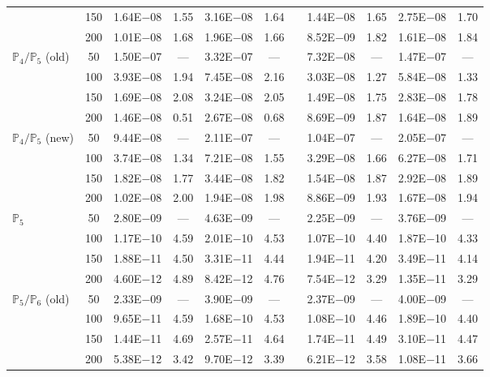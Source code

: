 \begin{table}[H]
{\begin{tabular}{@{}l c c c c c c c c c c@{}}
 & 150 & 1.64E$-$08 & 1.55  & 3.16E$-$08 & 1.64 &  & 1.44E$-$08 & 1.65 & 2.75E$-$08 & 1.70\\
 & 200 & 1.01E$-$08 & 1.68  & 1.96E$-$08 & 1.66 &  & 8.52E$-$09 & 1.82 & 1.61E$-$08 & 1.84\\
\midrule
\multirow{4}{*}{$\mathbb{P}_{4}/\mathbb{P}_{5}$ (old)}
 & 50 & 1.50E$-$07 & ---  & 3.32E$-$07 & --- &  & 7.32E$-$08 & --- & 1.47E$-$07 & ---\\
 & 100 & 3.93E$-$08 & 1.94  & 7.45E$-$08 & 2.16 &  & 3.03E$-$08 & 1.27 & 5.84E$-$08 & 1.33\\
 & 150 & 1.69E$-$08 & 2.08  & 3.24E$-$08 & 2.05 &  & 1.49E$-$08 & 1.75 & 2.83E$-$08 & 1.78\\
 & 200 & 1.46E$-$08 & 0.51  & 2.67E$-$08 & 0.68 &  & 8.69E$-$09 & 1.87 & 1.64E$-$08 & 1.89\\
\midrule
\multirow{4}{*}{$\mathbb{P}_{4}/\mathbb{P}_{5}$ (new)}
 & 50 & 9.44E$-$08 & ---  & 2.11E$-$07 & --- &  & 1.04E$-$07 & --- & 2.05E$-$07 & ---\\
 & 100 & 3.74E$-$08 & 1.34  & 7.21E$-$08 & 1.55 &  & 3.29E$-$08 & 1.66 & 6.27E$-$08 & 1.71\\
 & 150 & 1.82E$-$08 & 1.77  & 3.44E$-$08 & 1.82 &  & 1.54E$-$08 & 1.87 & 2.92E$-$08 & 1.89\\
 & 200 & 1.02E$-$08 & 2.00  & 1.94E$-$08 & 1.98 &  & 8.86E$-$09 & 1.93 & 1.67E$-$08 & 1.94\\
\midrule
\multirow{4}{*}{$\mathbb{P}_{5}$}
 & 50 & 2.80E$-$09 & ---  & 4.63E$-$09 & --- &  & 2.25E$-$09 & --- & 3.76E$-$09 & ---\\
 & 100 & 1.17E$-$10 & 4.59  & 2.01E$-$10 & 4.53 &  & 1.07E$-$10 & 4.40 & 1.87E$-$10 & 4.33\\
 & 150 & 1.88E$-$11 & 4.50  & 3.31E$-$11 & 4.44 &  & 1.94E$-$11 & 4.20 & 3.49E$-$11 & 4.14\\
 & 200 & 4.60E$-$12 & 4.89  & 8.42E$-$12 & 4.76 &  & 7.54E$-$12 & 3.29 & 1.35E$-$11 & 3.29\\
\midrule
\multirow{4}{*}{$\mathbb{P}_{5}/\mathbb{P}_{6}$ (old)}
 & 50 & 2.33E$-$09 & ---  & 3.90E$-$09 & --- &  & 2.37E$-$09 & --- & 4.00E$-$09 & ---\\
 & 100 & 9.65E$-$11 & 4.59  & 1.68E$-$10 & 4.53 &  & 1.08E$-$10 & 4.46 & 1.89E$-$10 & 4.40\\
 & 150 & 1.44E$-$11 & 4.69  & 2.57E$-$11 & 4.64 &  & 1.74E$-$11 & 4.49 & 3.10E$-$11 & 4.47\\
 & 200 & 5.38E$-$12 & 3.42  & 9.70E$-$12 & 3.39 &  & 6.21E$-$12 & 3.58 & 1.08E$-$11 & 3.66\\

\end{tabular}}
\end{table}
